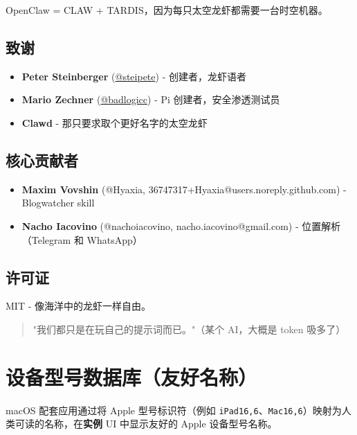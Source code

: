 OpenClaw = CLAW + TARDIS，因为每只太空龙虾都需要一台时空机器。

\subsection{致谢}


\begin{itemize}
  \item \textbf{Peter Steinberger} (\href{https://x.com/steipete}{@steipete}) - 创建者，龙虾语者
  \item \textbf{Mario Zechner} (\href{https://x.com/badlogicgames}{@badlogicc}) - Pi 创建者，安全渗透测试员
  \item \textbf{Clawd} - 那只要求取个更好名字的太空龙虾
\end{itemize}


\subsection{核心贡献者}


\begin{itemize}
  \item \textbf{Maxim Vovshin} (@Hyaxia, 36747317+Hyaxia@users.noreply.github.com) - Blogwatcher skill
  \item \textbf{Nacho Iacovino} (@nachoiacovino, nacho.iacovino@gmail.com) - 位置解析（Telegram 和 WhatsApp）
\end{itemize}


\subsection{许可证}


MIT - 像海洋中的龙虾一样自由。

\begin{quote}
"我们都只是在玩自己的提示词而已。"（某个 AI，大概是 token 吸多了）
\end{quote}



\clearpage

\section{设备型号数据库（友好名称）}


macOS 配套应用通过将 Apple 型号标识符（例如 \texttt{iPad16,6}、\texttt{Mac16,6}）映射为人类可读的名称，在\textbf{实例} UI 中显示友好的 Apple 设备型号名称。

